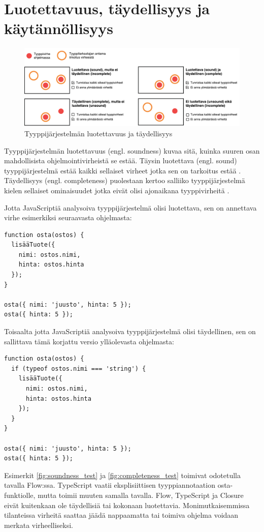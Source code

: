 \section{Luotettavuus, täydellisyys ja käytännöllisyys}
\begin{figure}[!htb]
\includegraphics[width=\textwidth]{images/soundness_completeness2.pdf}
\caption{Tyyppijärjestelmän luotettavuus ja täydellisyys}
\end{figure}
Tyyppijärjestelmän luotettavuus (engl. soundness) kuvaa sitä, kuinka suuren osan
mahdollisista ohjelmointivirheistä se estää. Täysin luotettava (engl. sound)
tyyppijärjestelmä estää kaikki sellaiset virheet jotka sen on tarkoitus
estää \cite{CSE_ProgrammingLanguages}. Täydellisyys (engl. \mbox{completeness})
puolestaan kertoo salliiko tyyppijärjestelmä kielen sellaiset ominaisuudet
jotka eivät olisi ajonaikana tyyppivirheitä \cite{TypesAndProgrammingLanguages, CSE_ProgrammingLanguages}.

Jotta JavaScriptiä analysoiva tyyppijärjestelmä olisi luotettava, sen on
annettava virhe esimerkiksi seuraavasta ohjelmasta:

\begin{lstlisting}[caption={Virheellinen JavaScript-ohjelma: lisätyllä tuotteella ei ole nimeä.},label={fig:soundness_test}]
function osta(ostos) {
  lisääTuote({
    nimi: ostos.nimi,
    hinta: ostos.hinta
  });
}

osta({ nimi: 'juusto', hinta: 5 });
osta({ hinta: 5 });
\end{lstlisting}
Toisaalta jotta JavaScriptiä analysoiva tyyppijärjestelmä olisi täydellinen,
sen on sallittava tämä korjattu versio ylläolevasta ohjelmasta:
\begin{lstlisting}[caption={Toimiva JavaScript-ohjelma: virheelliseltä kutsulta on suojauduttu tarkistuksella.},label={fig:completeness_test}]
function osta(ostos) {
  if (typeof ostos.nimi === 'string') {
    lisääTuote({
      nimi: ostos.nimi,
      hinta: ostos.hinta
    });
  }
}

osta({ nimi: 'juusto', hinta: 5 });
osta({ hinta: 5 });
\end{lstlisting}
Esimerkit \ref{fig:soundness_test} ja \ref{fig:completeness_test} toimivat
odotetulla tavalla Flow:ssa. TypeScript vaatii eksplisiittisen tyyppiannotaation
osta-funktiolle, mutta toimii muuten samalla tavalla. Flow, TypeScript ja
Closure eivät kuitenkaan ole täydellisiä tai kokonaan luotettavia.
Monimutkaisemmissa tilanteissa virheitä saattaa jäädä nappaamatta tai toimiva
ohjelma voidaan merkata virheelliseksi.

